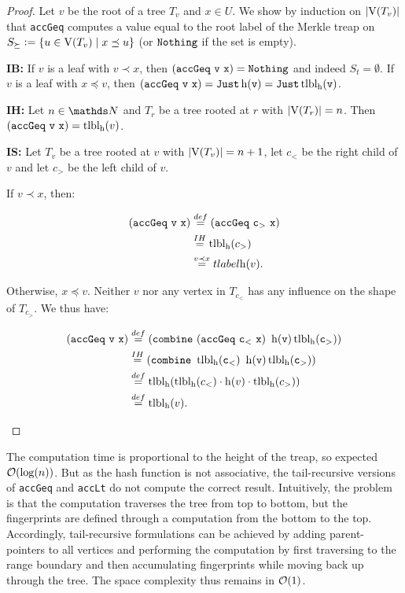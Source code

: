 \begin{proof}
Let $v$ be the root of a tree $T_v$ and $x \in U$. We show by induction on $|{\operatorname{V}(T_v)}|$ that \texttt{accGeq} computes a value equal to the root label of the Merkle treap on $S_{\succeq} \vcentcolon= \{u \in \operatorname{V}(T_v) \mid x \preceq u\}$ (or $\mathtt{Nothing}$ if the set is empty).

\textbf{IB:} If $v$ is a leaf with $v \prec x$, then $\mathtt{(accGeq\ v\ x)} = \mathtt{Nothing}$ and indeed $S_{t} = \emptyset$. If $v$ is a leaf with $x \preceq v$, then $\mathtt{(accGeq\ v\ x)} =  \mathtt{Just \operatorname{h}(v)} = \mathtt{Just \operatorname{tlbl_{\operatorname{h}}}(v)}$.

\textbf{IH:} Let  $n \in \N$ and $T_r$ be a tree rooted at $r$ with $|{\operatorname{V}(T_r)}| = n$. Then $\mathtt{(accGeq\ v\ x)} = \operatorname{tlbl_{\operatorname{h}}}(v)$.

\textbf{IS:} Let $T_v$ be a tree rooted at $v$ with $|{\operatorname{V}(T_v)}| = n + 1$, let $c_{<}$ be the right child of $v$  and let $c_
{>}$ be the left child of $v$.

\begin{caselist}
\case If $v \prec x$, then:

\begin{align*}
\mathtt{(accGeq\ v\ x)} &\overset{def}= \mathtt{(accGeq\ c_{>}\ x)}\\
&\overset{IH}= \tlabel{\h}(c_{>})\\
&\overset{v \prec x}= tlabel{\h}(v).\\
\end{align*}

\case Otherwise, $x \preceq v$. Neither $v$ nor any vertex in $T_{c_{<}}$ has any influence on the shape of $T_{c_{>}}$. We thus have:

\begin{align*}
\mathtt{(accGeq\ v\ x)} &\overset{def}= \mathtt{(combine\ (accGeq\ c_{<}\ x)\ \h(v) \tlabel{\h}(c_{>}))}\\
&\overset{IH}= \mathtt{(combine\ \tlabel{\h}(c_{<})\ \h(v) \tlabel{\h}(c_{>}))}\\
&\overset{def}= \tlabel{\h}(\tlabel{\h}(c_{<}) \concatenate \h(v) \concatenate \tlabel{\h}(c_{>}))\\
&\overset{def}= \tlabel{\h}(v).\\
\end{align*}
\end{caselist}
\end{proof}

The computation time is proportional to the height of the treap, so expected $\mathcal{O}(\log(n))$. But as the hash function is not associative, the tail-recursive versions of \texttt{accGeq} and \texttt{accLt} do not compute the correct result. Intuitively, the problem is that the computation traverses the tree from top to bottom, but the fingerprints are defined through a computation from the bottom to the top. Accordingly, tail-recursive formulations can be achieved by adding parent-pointers to all vertices and performing the computation by first traversing to the range boundary and then accumulating fingerprints while moving back up through the tree. The space complexity thus remains in $\mathcal{O}(1)$.


